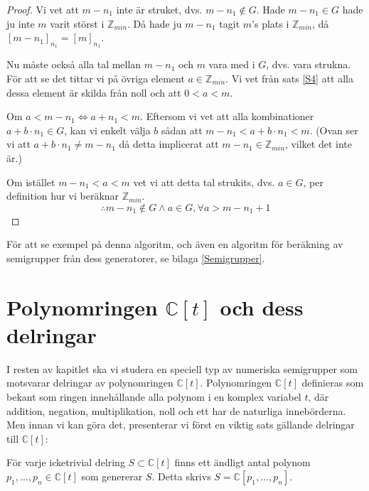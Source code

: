 \begin{enumerate}
\begin{proof}
Vi vet att $m-n_1$ inte är struket, dvs. $m-n_1 \notin G$. Hade $m-n_1 \in G$ hade ju inte $m$ varit störst i $\mathbb{Z}_{min}$. Då hade ju $m-n_1$ tagit $m$'s plats i $\mathbb{Z}_{min}$, då $[m-n_1]_{n_1} = [m]_{n_1}$.

Nu måste också alla tal mellan $m-n_1$ och $m$ vara med i $G$, dvs. vara strukna. För att se det tittar vi på övriga element $a \in \mathbb{Z}_{min}$. Vi vet från sats \ref{S4} att alla dessa element är skilda från noll och att $0 < a < m$.

Om $a < m-n_1 \Longleftrightarrow a+n_1<m$. Eftersom vi vet att alla kombinationer $a+b\cdot n_1 \in G$, kan vi enkelt välja $b$ sådan att $m-n_1 < a+b\cdot n_1 < m$. (Ovan ser vi att $a+b\cdot n_1 \neq m-n_1$ då detta implicerat att $m-n_1 \in \mathbb{Z}_{min}$, vilket det inte är.)

Om istället $m-n_1 < a < m$ vet vi att detta tal strukits, dvs. $a \in G$, per definition hur vi beräknar $\mathbb{Z}_{min}$.
\[\therefore m-n_1 \notin G \wedge a \in G, \forall a > m-n_1+1\]
\end{proof}
\end{enumerate}

För att se exempel på denna algoritm, och även en algoritm för beräkning av semigrupper från dess generatorer, se bilaga \ref{Semigrupper}.

\section{Polynomringen $\mathbb{C}\left[t\right]$ och dess delringar}

I resten av kapitlet ska vi studera en speciell typ av numeriska semigrupper som motsvarar delringar av polynomringen $\mathbb{C}\left[t\right]$. Polynomringen $\mathbb{C}\left[t\right]$ definieras som bekant som ringen innehållande alla polynom i en komplex variabel $t$, där addition, negation, multiplikation, noll och ett har de naturliga innebörderna. Men innan vi kan göra det, presenterar vi först en viktig sats gällande delringar till $\mathbb{C}\left[t\right]$:

\begin{Theorem}
\label{FinitelyGenerated}
För varje icketrivial delring $S \subset \mathbb{C}\left[t\right]$ finns ett ändligt antal polynom $p_1,\ldots,p_n \in \mathbb{C}\left[t\right]$ som genererar $S$. Detta skrivs $S=\mathbb{C}\left[p_1,\ldots,p_n\right]$.
\end{Theorem}

